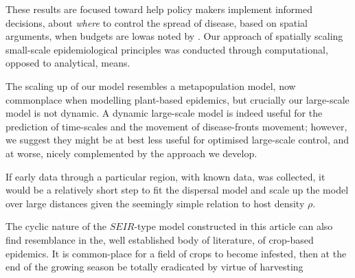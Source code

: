 These results are focused toward help policy makers implement informed decisions, about \textit{where} to control the spread of disease, based on spatial arguments, when budgets are low\textemdash as noted by \cite{time-varying-infectivity}. Our approach of spatially scaling small-scale epidemiological principles was conducted through computational, opposed to analytical, means. 

The scaling up of our model resembles a metapopulation model, now commonplace when modelling plant-based epidemics, but crucially our large-scale model is not dynamic. A dynamic large-scale model is indeed useful for the prediction of time-scales and the movement of disease-fronts movement; however, we suggest they might be at best less useful for optimised large-scale control, and at worse, nicely complemented by the approach we develop.

If early data through a particular region, with known data, was collected, it would be a relatively short step to fit the dispersal model and scale up the model over large distances given the seemingly simple relation to host density $\rho$.



The cyclic nature of the $SEIR$-type model constructed in this article can also find resemblance in the, well established body of literature, of crop-based epidemics. It is common-place for a field of crops to become infested, then at the end of the growing season be totally eradicated by virtue of harvesting 

